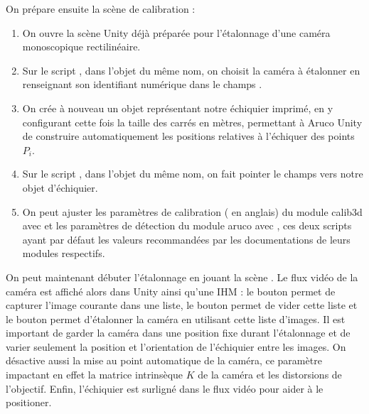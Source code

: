 On prépare ensuite la scène de calibration :
\begin{enumerate}
  \item On ouvre la scène Unity  déjà préparée pour l'étalonnage d'une caméra monoscopique rectilinéaire.
  \item Sur le script , dans l'objet du même nom, on choisit la caméra à étalonner en renseignant son identifiant numérique dans le champs .
  \item On crée à nouveau un objet représentant notre échiquier imprimé, en y configurant cette fois la taille des carrés en mètres, permettant à Aruco Unity de construire automatiquement les positions relatives à l'échiquer des points $P_i$.
  \item Sur le script , dans l'objet du même nom, on fait pointer le champs  vers notre objet d'échiquier.
  \item On peut ajuster les paramètres de calibration ( en anglais) du module calib3d avec  et les paramètres de détection du module aruco avec , ces deux scripts ayant par défaut les valeurs recommandées par les documentations de leurs modules respectifs.
\end{enumerate}


On peut maintenant débuter l'étalonnage en jouant la scène . Le flux vidéo de la caméra est affiché alors dans Unity ainsi qu'une IHM : le bouton  permet de capturer l'image courante dans une liste, le bouton  permet de vider cette liste et le bouton  permet d'étalonner la caméra en utilisant cette liste d'images. Il est important de garder la caméra dans une position fixe durant l'étalonnage et de varier seulement la position et l'orientation de l'échiquier entre les images. On désactive aussi la mise au point automatique de la caméra, ce paramètre impactant en effet la matrice intrinsèque	$K$ de la caméra et les distorsions de l'objectif. Enfin, l'échiquier est surligné dans le flux vidéo pour aider à le positioner.

